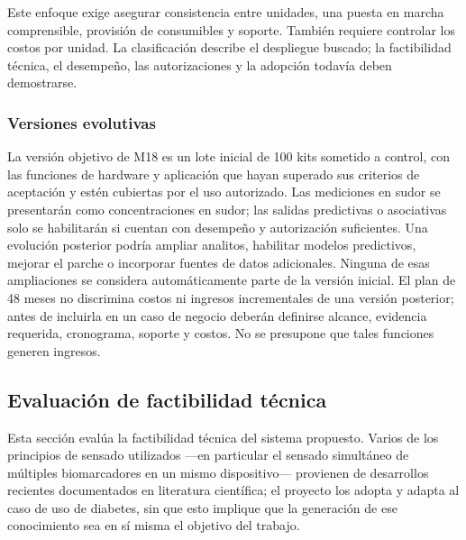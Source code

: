 Este enfoque exige asegurar consistencia entre unidades, una puesta en marcha comprensible, provisión de consumibles y soporte. También requiere controlar los costos por unidad. La clasificación describe el despliegue buscado; la factibilidad técnica, el desempeño, las autorizaciones y la adopción todavía deben demostrarse.

\subsubsection*{Versiones evolutivas}
La versión objetivo de M18 es un lote inicial de 100 kits sometido a control, con las funciones de hardware y aplicación que hayan superado sus criterios de aceptación y estén cubiertas por el uso autorizado. Las mediciones en sudor se presentarán como concentraciones en sudor; las salidas predictivas o asociativas solo se habilitarán si cuentan con desempeño y autorización suficientes. Una evolución posterior podría ampliar analitos, habilitar modelos predictivos, mejorar el parche o incorporar fuentes de datos adicionales. Ninguna de esas ampliaciones se considera automáticamente parte de la versión inicial. El plan de 48 meses no discrimina costos ni ingresos incrementales de una versión posterior; antes de incluirla en un caso de negocio deberán definirse alcance, evidencia requerida, cronograma, soporte y costos. No se presupone que tales funciones generen ingresos.


\subsection{Evaluación de factibilidad técnica}




Esta sección evalúa la factibilidad técnica del sistema propuesto. Varios de los principios de sensado utilizados —en particular el sensado simultáneo de múltiples biomarcadores en un mismo dispositivo— provienen de desarrollos recientes documentados en literatura científica; el proyecto los adopta y adapta al caso de uso de diabetes, sin que esto implique que la generación de ese conocimiento sea en sí misma el objetivo del trabajo.

